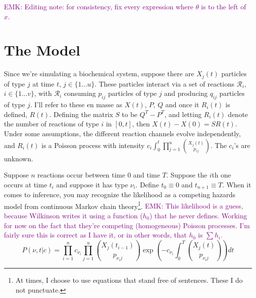\documentclass{article}
\newcommand\EMK[1]{\textcolor{purple}{EMK: #1}}
\begin{document}
%
% 
\EMK{Editing note: for consistency, fix every expression where $\theta$ is to the left of $x$.}

\section{The Model}
Since we're simulating a biochemical system, suppose there are $X_{j}(t)$ particles of type $j$ at time $t$, $j\in \{1 ... u\}$. These particles interact via a set of reactions $\mathcal{R}_i$, $i\in \{1 ... v\}$, with $\mathcal{R}_i$ consuming $p_{ij}$ particles of type $j$ and producing $q_{ij}$ particles of type $j$. I'll refer to these en masse as $X(t)$, $P$, $Q$ and once it $R_i(t)$ is defined, $R(t)$. Defining the matrix $S$ to be $Q^T-P^T$, and letting $R_{i}(t)$ denote the number of reactions of type $i$ in $[0,t]$, then $X(t) - X(0) = SR(t)$. Under some assumptions, the different reaction channels evolve independently, and $R_i(t)$ is a Poisson process with intensity $c_i\int_0^t \prod_{j=1}^u {{X_j(t)}\choose{p_{ij}}}$. %
The $c_i$'s are unknown.

Suppose $n$ reactions occur between time $0$ and time $T$. Suppose the $i$th one occurs at time $t_i$ and suppose it has type $\nu_i$. Define $t_0\equiv0$ and $t_{n+1}\equiv T$. When it comes to inference, you may recognize the likelihood as a competing hazards model from continuous Markov chain theory\footnote{At times, I choose to use equations that stand free of sentences. These I do not punctuate.}. \EMK{This likelihood is a guess, because Wilkinson writes it using a function ($h_0$) that he never defines. Working for now on the fact that they're competing (homogeneous) Poisson processes. I'm fairly sure this is correct as I have it, or in other words, that $h_0$ is $\sum h_i$.}
$$P(\nu, t|c) = \prod_{i=1}^n c_{\nu_i} \prod_{j=1}^u {{X_{j}(t_{i-1})}\choose{p_{{\nu_i}j}}}\exp(-c_{\nu_i}\int_0^T {{X_j(t)}\choose{p_{{\nu_i}j}}} )dt$$
\end{document}
